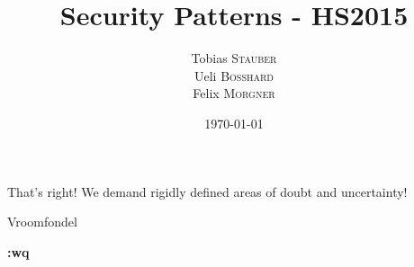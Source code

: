 \documentclass{report}
\title{Security Patterns - HS2015}
\author{Tobias \textsc{Stauber}\\Ueli \textsc{Bosshard}\\Felix \textsc{Morgner}}
\date{\today}
\newcommand{\inputChapter}[1]{}
\begin{document}
\maketitle
\clearpage
\vspace*{\fill}
  \epigraph{That's right! We demand rigidly defined areas of doubt and uncertainty!}{Vroomfondel}
\vfill
\clearpage

\setcounter{tocdepth}{0}
\tableofcontents

\inputChapter{00-wrapper_facade}

\clearpage
\vspace*{\fill}
\begin{center}
    { \huge \bfseries :wq }
\end{center}
\vfill
\clearpage
\end{document}
